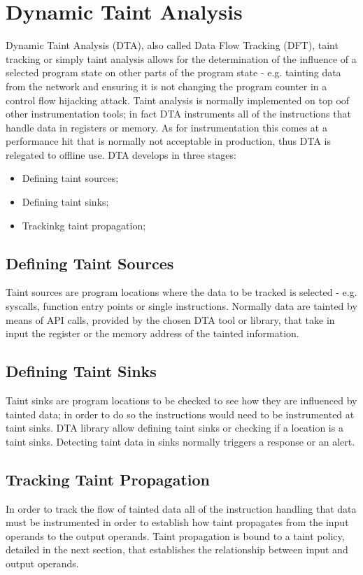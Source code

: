 \chapter{Dynamic Taint Analysis}
Dynamic Taint Analysis (DTA), also called Data Flow Tracking (DFT), taint tracking or simply taint analysis allows for
the determination of the influence of a selected program state on other parts of the program state - e.g. tainting data
from the network and ensuring it is not changing the program counter in a control flow hijacking attack. Taint analysis
is normally implemented on top oof other instrumentation tools; in fact DTA instruments all of the instructions that
handle data in registers or memory. As for instrumentation this comes at a performance hit that is normally not
acceptable in production, thus DTA is relegated to offline use. DTA develops in three stages:
\begin{itemize}
    \item Defining taint sources;
    \item Defining taint sinks;
    \item Trackinkg taint propagation;
\end{itemize}



\section{Defining Taint Sources}
Taint sources are program locations where the data to be tracked is selected - e.g. syscalls, function entry points or
single instructions. Normally data are tainted by means of API calls, provided by the chosen DTA tool or library, that
take in input the register or the memory address of the tainted information.



\section{Defining Taint Sinks}
Taint sinks are program locations to be checked to see how they are influenced by tainted data; in order to do so the
instructions would need to be instrumented at taint sinks. DTA library allow defining taint sinks or checking if a
location is a taint sinks. Detecting taint data in sinks normally triggers a response or an alert.



\section{Tracking Taint Propagation}
In order to track the flow of tainted data all of the instruction handling that data must be instrumented in order to
establish how taint propagates from the input operands to the output operands. Taint propagation is bound to a taint
policy, detailed in the next section, that establishes the relationship between input and output operands.



